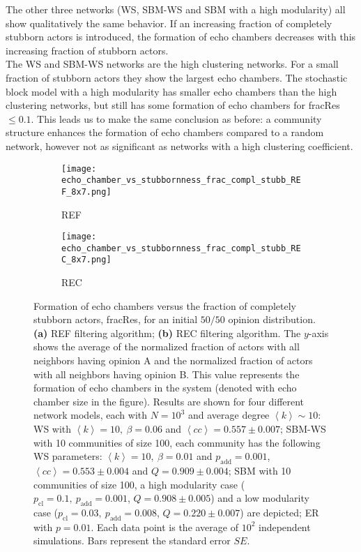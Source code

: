\documentclass[11 pt , letterpaper , twoside , openright]{book}
\begin{document}
\newline
The other three networks (WS, SBM-WS and SBM with a high modularity) all show qualitatively the same behavior. If an increasing fraction of completely stubborn actors is introduced, the formation of echo chambers decreases with this increasing fraction of stubborn actors.\\
\newline
The WS and SBM-WS networks are the high clustering networks. For a small fraction of stubborn actors they show the largest echo chambers. The stochastic block model with a high modularity has smaller echo chambers than the high clustering networks, but still has some formation of echo chambers for fracRes $\leqslant 0.1$. This leads us to make the same conclusion as before: a community structure enhances the formation of echo chambers compared to a random network, however not as significant as networks with a high clustering coefficient.
\begin{figure}[H]
  \begin{subfigure}[t]{0.49\textwidth}
    \caption{REF}
  	\texttt{[image: echo\_chamber\_vs\_stubbornness\_frac\_compl\_stubb\_REF\_8x7.png]}
  \end{subfigure}
  \begin{subfigure}[t]{0.49\textwidth}
    \caption{REC}
  	\texttt{[image: echo\_chamber\_vs\_stubbornness\_frac\_compl\_stubb\_REC\_8x7.png]}
    \label{REC_frac_compl_stubb}
  \end{subfigure}
  \captionsetup{format=plain}
  \caption[Formation of echo chambers versus fraction of completely stubborn actors for the REF and REC filtering algorithms and an initial $50/50$ opinion distribution.]{Formation of echo chambers versus the fraction of completely stubborn actors, fracRes, for an initial $50/50$ opinion distribution. \textbf{(a)} REF filtering algorithm; \textbf{(b)} REC filtering algorithm. The $y$-axis shows the average of the normalized fraction of actors with all neighbors having opinion A and the normalized fraction of actors with all neighbors having opinion B. This value represents the formation of echo chambers in the system (denoted with echo chamber size in the figure). Results are shown for four different network models, each with $N=10^3$ and average degree $\left<k\right> \sim 10$: WS with $\left<k\right> =10,\ \beta = 0.06$ and $\left<cc \right> = 0.557 \pm 0.007$; SBM-WS with 10 communities of size 100, each community has the following WS parameters: $\left<k\right> = 10,\ \beta = 0.01$ and $p_{\text{add}} = 0.001$, $\left<cc\right> = 0.553 \pm 0.004$ and $Q = 0.909 \pm 0.004$; SBM with 10 communities of size 100, a high modularity case ($p_{\text{cl}} = 0.1,\ p_{\text{add}} = 0.001$, $Q = 0.908 \pm 0.005$) and a low modularity case ($p_{\text{cl}} = 0.03,\ p_{\text{add}} = 0.008$, $Q = 0.220 \pm 0.007$) are depicted; ER with $p= 0.01$. Each data point is the average of $10^2$ independent simulations. Bars represent the standard error $SE$.}
\label{echo_vs_frac_complStubb_REF-REC}
\end{figure}
\end{document}
